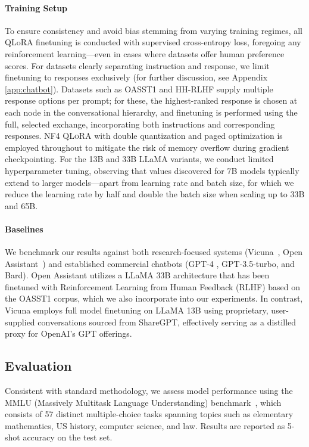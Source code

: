 \paragraph{Training Setup} To ensure consistency and avoid bias stemming from varying training regimes, all QLoRA finetuning is conducted with supervised cross-entropy loss, foregoing any reinforcement learning—even in cases where datasets offer human preference scores. For datasets clearly separating instruction and response, we limit finetuning to responses exclusively (for further discussion, see Appendix \ref{app:chatbot}). Datasets such as OASST1 and HH-RLHF supply multiple response options per prompt; for these, the highest-ranked response is chosen at each node in the conversational hierarchy, and finetuning is performed using the full, selected exchange, incorporating both instructions and corresponding responses. NF4 \textsc{QLoRA} with double quantization and paged optimization is employed throughout to mitigate the risk of memory overflow during gradient checkpointing. For the 13B and 33B LLaMA variants, we conduct limited hyperparameter tuning, observing that values discovered for 7B models typically extend to larger models—apart from learning rate and batch size, for which we reduce the learning rate by half and double the batch size when scaling up to 33B and 65B.

\paragraph{Baselines} We benchmark our results against both research-focused systems (Vicuna~\citep{vicuna2023}, Open Assistant~\citep{kopf2023openassistant}) and established commercial chatbots (GPT-4 \citep{openai2023gpt}, GPT-3.5-turbo, and Bard). Open Assistant utilizes a LLaMA 33B architecture that has been finetuned with Reinforcement Learning from Human Feedback (RLHF) based on the OASST1 corpus, which we also incorporate into our experiments. In contrast, Vicuna employs full model finetuning on LLaMA 13B using proprietary, user-supplied conversations sourced from ShareGPT, effectively serving as a distilled proxy for OpenAI’s GPT offerings.

\subsection{Evaluation}

Consistent with standard methodology, we assess model performance using the MMLU (Massively Multitask Language Understanding) benchmark~\citep{hendrycksmeasuring}, which consists of 57 distinct multiple-choice tasks spanning topics such as elementary mathematics, US history, computer science, and law. Results are reported as 5-shot accuracy on the test set.

